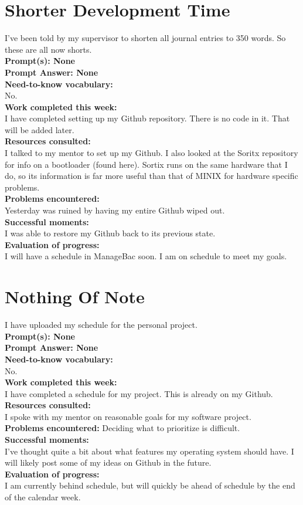 \documentclass[11pt]{article}
\begin{document}
\section{Shorter Development Time}
I've been told by my supervisor to shorten all journal entries to 350 words. So these are all now shorts.\\
\textbf{Prompt(s): None}\\
\textbf{Prompt Answer: None}\\
\textbf{Need-to-know vocabulary:}\\
No.\\
\textbf{Work completed this week:}\\
I have completed setting up my Github repository. There is no code in it. That will be added later.\\
\textbf{Resources consulted:}\\
I talked to my mentor to set up my Github. I also looked at the Soritx repository for info on a bootloader (found here). Sortix runs on the same hardware that I do, so its information is far more useful than that of MINIX for hardware specific problems.\\
\textbf{Problems encountered:}\\
Yesterday was ruined by having my entire Github wiped out.\\
\textbf{Successful moments:}\\
I was able to restore my Github back to its previous state.\\
\textbf{Evaluation of progress:}\\
I will have a schedule in ManageBac soon. I am on schedule to meet my goals.
\section{Nothing Of Note}
I have uploaded my schedule for the personal project.\\
\textbf{Prompt(s): None}\\
\textbf{Prompt Answer: None}\\
\textbf{Need-to-know vocabulary:}\\
No.\\
\textbf{Work completed this week:}\\
I have completed a schedule for my project. This is already on my Github.\\
\textbf{Resources consulted:}\\
I spoke with my mentor on reasonable goals for my software project.\\
\textbf{Problems encountered:}
Deciding what to prioritize is difficult.\\
\textbf{Successful moments:}\\
I've thought quite a bit about what features my operating system should have. I will likely post some of my ideas on Github in the future.\\
\textbf{Evaluation of progress:}\\
I am currently behind schedule, but will quickly be ahead of schedule by the end of the calendar week.
\end{document}
